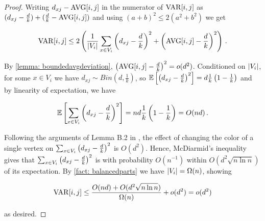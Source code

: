 \begin{proof}
    Writing $d_{xj}-\AVG{i}{j}$ in the numerator of $\VAR{i}{j}$ as $(d_{xj}-\frac{d}{k})+(\frac{d}{k}-\AVG{i}{j})$ and using $(a+b)^2\leq 2(a^2+b^2)$ we get
    
    $$\VAR{i}{j}\leq 2\Paren{\frac{1}{\Abs{V_i}}\sum_{x\in V_i}\Paren{d_{xj}-\frac{d}{k}}^2+\Paren{\AVG{i}{j}-\frac{d}{k}}^2}\,.$$

    By \cref{lemma: boundedavgdeviation}, \whp $\Paren{\AVG{i}{j}-\frac{d}{k}}^2=o(d^2)$. Conditioned on $\left\lvert V_i\right\rvert$, for some $x\in V_i$ we have $d_{xj}\sim Bin(d, \frac{1}{k})$, so $\operatorname*{\mathbb{E}}\left[\left(d_{xj}-\frac{d}{k}\right)^2\right]=d\frac{1}{k}\left(1-\frac{1}{k}\right)$ and by linearity of expectation, we have

    $$\operatorname*{\mathbb{E}}\left[\sum_{x\in V_i}\left(d_{xj}-\frac{d}{k}\right)^2\right]=nd\frac{1}{k}\left(1-\frac{1}{k}\right)=O(nd)\,.$$
    
    Following the arguments of Lemma B.2 in \cite{MR3536556-David16}, the effect of changing the color of a single vertex on $\sum_{x\in V_i}\left(d_{xj}-\frac{d}{k}\right)^2$ is $O(d^2)$. Hence, McDiarmid's inequality gives that $\sum_{x\in V_i}\left(d_{xj}-\frac{d}{k}\right)^2$ is with probability $O(n^{-1})$ within $O(d^2 \sqrt{n\ln{n}})$ of its expectation. By \cref{fact: balancedparts} we have $\left\lvert V_i\right\rvert=\Omega(n)$, showing
    
    $$\VAR{i}{j}\leq\frac{O(nd)+O(d^2\sqrt{n\ln{n}})}{\Omega(n)}+o(d^2)=o(d^2)$$

    as desired.
\end{proof}


